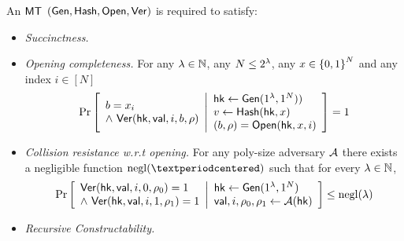 \begin{definition} [Properties of $\MT$]\label{def:MT}
An $\MT$ $(\mathsf{Gen}, \mathsf{Hash}, \mathsf{Open}, \mathsf{Ver})$ is required to satisfy:
\begin{itemize}
    \item \emph{Succinctness. } \TODO{}
    \item \emph{Opening completeness. } For any $\lambda \in \mathbb{N}$, any $N \leq 2^\lambda$, any $x\in\left \{{0,1} \right \}^N$ and any index $i\in[N]$
    \begin{gather*}
        \Pr \left[ \begin{array}{ll} 
        b= x_i \\
        \wedge ~\mathsf{Ver}(\mathsf{hk}, \mathsf{val}, i, b, \rho)
         \end{array} \middle\vert \begin{array}{ll} 
        \mathsf{hk} \leftarrow \mathsf{Gen}(1^\lambda, 1^N)
        )\\
        v \leftarrow \mathsf{Hash}(\mathsf{hk}, x) \\
        (b, \rho) = \mathsf{Open}(\mathsf{hk}, x, i) \\
         \end{array} \right] = 1
    \end{gather*}
    \item \emph{Collision resistance w.r.t opening. } For any poly-size adversary $\mathcal{A}$ there exists a negligible function $\negl(·)$ such that for every $\lambda \in \mathbb{N}$,
    \begin{gather*}
        \Pr \left[ \begin{array}{ll} 
        \mathsf{Ver}(\mathsf{hk}, \mathsf{val}, i, 0, \rho_0 ) = 1 \\
        \wedge ~\mathsf{Ver}(\mathsf{hk}, \mathsf{val}, i, 1, \rho_1 ) = 1
         \end{array} \middle\vert \begin{array}{ll} 
        \mathsf{hk} \leftarrow \mathsf{Gen}(1^\lambda, 1^N
        ) \\
        \mathsf{val}, i, \rho_0, \rho_1 \leftarrow \mathcal{A}(\mathsf{hk})
         \end{array} \right] \leq \operatorname{negl}(\lambda)
    \end{gather*}
    \item \emph{Recursive Constructability. }

\end{itemize}
\end{definition}
